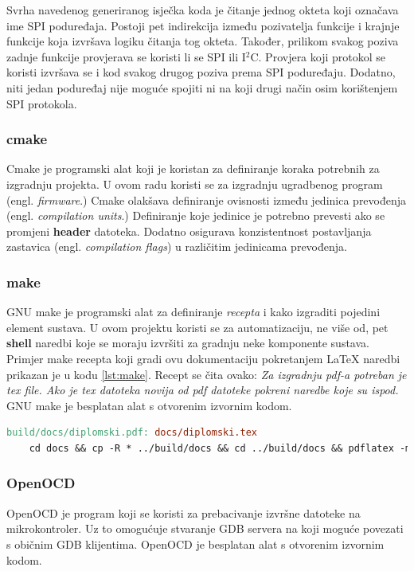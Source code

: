 \documentclass[times, utf8, diplomski]{diplomski}
\begin{document}
Svrha navedenog generiranog isječka koda je čitanje jednog okteta koji označava ime SPI poduređaja. Postoji pet indirekcija između pozivatelja funkcije i krajnje funkcije koja izvršava logiku čitanja tog okteta. Također, prilikom svakog poziva zadnje funkcije provjerava se koristi li se SPI ili I\(^2\)C. Provjera koji protokol se koristi izvršava se i kod svakog drugog poziva prema SPI poduređaju. Dodatno, niti jedan poduređaj nije moguće spojiti ni na koji drugi način osim korištenjem SPI protokola.

\subsubsection{cmake}
Cmake je programski alat koji je koristan za definiranje koraka potrebnih za izgradnju projekta. U ovom radu koristi se za izgradnju ugradbenog program (engl. \textit{firmware}.) Cmake olakšava definiranje ovisnosti između jedinica prevođenja (engl. \textit{compilation units}.) Definiranje koje jedinice je potrebno prevesti ako se promjeni \textbf{header} datoteka. Dodatno osigurava konzistentnost postavljanja zastavica (engl. \textit{compilation flags}) u različitim jedinicama prevođenja.

\subsubsection{make}
GNU make je programski alat za definiranje \textit{recepta} i kako izgraditi pojedini element sustava. U ovom projektu koristi se za automatizaciju, ne više od, pet \textbf{shell} naredbi koje se moraju izvršiti za gradnju neke komponente sustava. Primjer make recepta koji gradi ovu dokumentaciju pokretanjem \LaTeX \cite{ungar2002uvod} naredbi prikazan je u kodu \ref{lst:make}. Recept se čita ovako: \textit{Za izgradnju pdf-a potreban je tex file. Ako je tex datoteka novija od pdf datoteke pokreni naredbe koje su ispod.} GNU make je besplatan alat s otvorenim izvornim kodom.

\begin{lstlisting}[language=make, label={lst:make}, caption={Gradnja dokumentacije korištenjem make recepta}]
build/docs/diplomski.pdf: docs/diplomski.tex
	cd docs && cp -R * ../build/docs && cd ../build/docs && pdflatex -mltex diplomski.tex && bibtex diplomski && pdflatex -mltex diplomski.tex
\end{lstlisting}

\subsubsection{OpenOCD}
OpenOCD \cite{openocd} je program koji se koristi za prebacivanje izvršne datoteke na mikrokontroler. Uz to omogućuje stvaranje GDB servera na koji moguće povezati s običnim GDB klijentima. OpenOCD je besplatan alat s otvorenim izvornim kodom.
\end{document}
